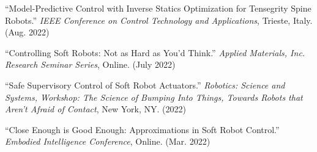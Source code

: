\documentclass[letterpaper]{deedy-resume} %
\begin{document}
\begin{etaremune}[itemsep=0.1cm]
\item ``Model-Predictive Control with Inverse Statics Optimization for Tensegrity Spine Robots.'' {\it IEEE Conference on Control Technology and Applications}, Trieste, Italy. (Aug. 2022)

\item ``Controlling Soft Robots: Not as Hard as You'd Think.'' {\it Applied Materials, Inc. Research Seminar Series}, Online. (July 2022)

\item ``Safe Supervisory Control of Soft Robot Actuators.'' {\it Robotics: Science and Systems, Workshop: The Science of Bumping Into Things, Towards Robots that Aren't Afraid of Contact}, New York, NY. (2022)

\item ``Close Enough is Good Enough: Approximations in Soft Robot Control.'' {\it Embodied Intelligence Conference}, Online. (Mar. 2022)


 \end{etaremune}

\vspace{0.2cm}

{}
\end{document}
